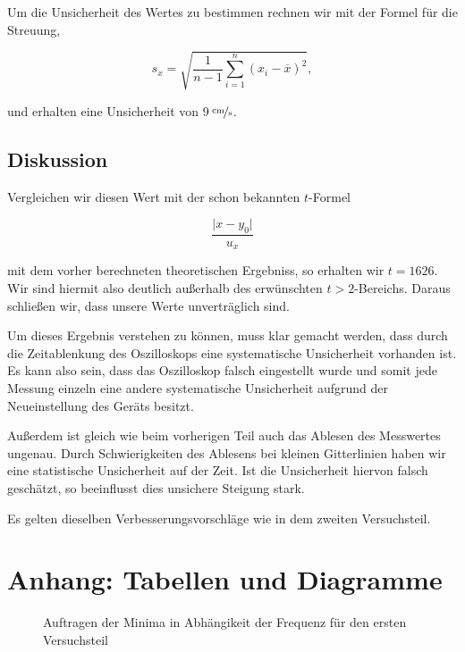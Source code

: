 \documentclass[11pt,a4paper]{article}
\begin{document}
Um die Unsicherheit des Wertes zu bestimmen rechnen wir mit der Formel f\"ur die Streuung,

\[s_x=\sqrt{\frac{1}{n-1}\sum_{i=1}^n(x_i-\overline{x})^2},\]

und erhalten eine Unsicherheit von 9\,$\nicefrac{\mathrm{cm}}{\mathrm{s}}$.

\subsection{Diskussion}

Vergleichen wir diesen Wert mit der schon bekannten $t$-Formel

\[\frac{\vert x-y_0\vert}{u_x}\]

mit dem vorher berechneten theoretischen Ergebniss, so erhalten wir $t=1626$. Wir sind hiermit also deutlich au\ss erhalb des erw\"unschten $t>2$-Bereichs. Daraus schlie\ss en wir, dass unsere Werte unvertr\"aglich sind.

Um dieses Ergebnis verstehen zu k\"onnen, muss klar gemacht werden, dass durch die Zeitablenkung des Oszilloskops eine systematische Unsicherheit vorhanden ist. Es kann also sein, dass das Oszilloskop falsch eingestellt wurde und somit jede Messung einzeln eine andere systematische Unsicherheit aufgrund der Neueinstellung des Ger\"ats besitzt.

Au\ss erdem ist gleich wie beim vorherigen Teil auch das Ablesen des Messwertes ungenau. Durch Schwierigkeiten des Ablesens bei kleinen Gitterlinien haben wir eine statistische Unsicherheit auf der Zeit. Ist die Unsicherheit hiervon falsch gesch\"atzt, so beeinflusst dies unsichere Steigung stark.

Es gelten dieselben Verbesserungsvorschläge wie in dem zweiten Versuchsteil. 

\section{Anhang: Tabellen und Diagramme}


\begin{figure}[p]
\centering
{}
\renewcommand\thefigure{3}
\caption[Auftragen der Minima in Abh\"angikeit der Frequenz f\"ur den ersten Versuchsteil]{Auftragen der Minima in Abh\"angikeit der Frequenz f\"ur den ersten Versuchsteil}
\label{Abb:3}
\end{figure}
\end{document}

